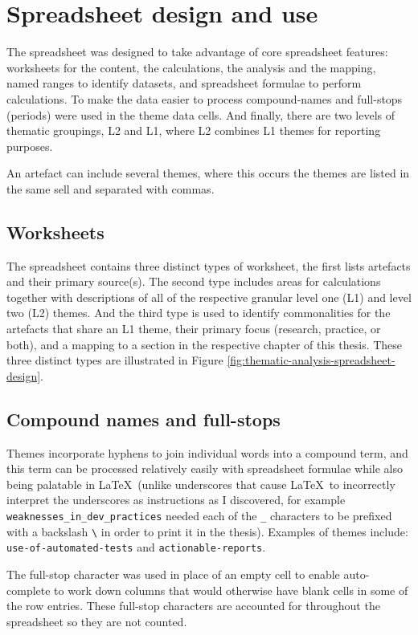 \section{Spreadsheet design and use}
The spreadsheet was designed to take advantage of core spreadsheet features: worksheets for the content, the calculations, the analysis and the mapping, named ranges to identify datasets, and spreadsheet formulae to perform calculations. To make the data easier to process compound-names and full-stops (periods) were used in the theme data cells. And finally, there are two levels of thematic groupings, L2 and L1, where L2 combines L1 themes for reporting purposes.

An artefact can include several themes, where this occurs the themes are listed in the same sell and separated with commas.

\subsection{Worksheets}
The spreadsheet contains three distinct types of worksheet, the first lists artefacts and their primary source(s). The second type includes areas for calculations together with descriptions of all of the respective granular level one (L1) and level two (L2) themes. And the third type is used to identify commonalities for the artefacts that share an L1 theme, their primary focus (research, practice, or both), and a mapping to a section in the respective chapter of this thesis. These three distinct types are illustrated in Figure \ref{fig:thematic-analysis-spreadsheet-design}. 


\subsection{Compound names and full-stops}
Themes incorporate hyphens to join individual words into a compound term, and this term can be processed relatively easily with spreadsheet formulae while also being palatable in \LaTeX ~(unlike underscores that cause \LaTeX ~to incorrectly interpret the underscores as instructions as I discovered, for example \texttt{weaknesses\_in\_dev\_practices} needed each of the \texttt{\_} characters to be prefixed with a backslash \texttt{\textbackslash} in order to print it in the thesis). Examples of themes include: \texttt{use-of-automated-tests} and \texttt{actionable-reports}.

The full-stop character was used in place of an empty cell to enable auto-complete to work down columns that would otherwise have blank cells in some of the row entries. These full-stop characters are accounted for throughout the spreadsheet so they are not counted.


